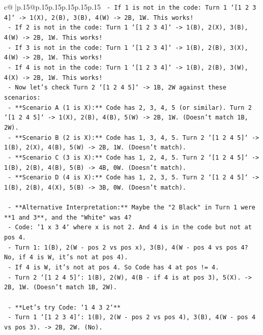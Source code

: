 \documentclass{article}
\begin{document}
{\begin{supertabular}{c@{$\;$}|p{.15\linewidth}@{}p{.15\linewidth}p{.15\linewidth}p{.15\linewidth}p{.15\linewidth}p{.15\linewidth}}
{{{\texttt{        {-} If 1 is not in the code: Turn 1 `{[}1 2 3 4{]}` {-}> 1(X), 2(B), 3(B), 4(W) {-}> 2B, 1W. This works!} \\
\texttt{        {-} If 2 is not in the code: Turn 1 `{[}1 2 3 4{]}` {-}> 1(B), 2(X), 3(B), 4(W) {-}> 2B, 1W. This works!} \\
\texttt{        {-} If 3 is not in the code: Turn 1 `{[}1 2 3 4{]}` {-}> 1(B), 2(B), 3(X), 4(W) {-}> 2B, 1W. This works!} \\
\texttt{        {-} If 4 is not in the code: Turn 1 `{[}1 2 3 4{]}` {-}> 1(B), 2(B), 3(W), 4(X) {-}> 2B, 1W. This works!} \\
\texttt{    {-} Now let's check Turn 2 `{[}1 2 4 5{]}` {-}> 1B, 2W against these scenarios:} \\
\texttt{        {-} **Scenario A (1 is X):** Code has 2, 3, 4, 5 (or similar). Turn 2 `{[}1 2 4 5{]}` {-}> 1(X), 2(B), 4(B), 5(W) {-}> 2B, 1W. (Doesn't match 1B, 2W).} \\
\texttt{        {-} **Scenario B (2 is X):** Code has 1, 3, 4, 5. Turn 2 `{[}1 2 4 5{]}` {-}> 1(B), 2(X), 4(B), 5(W) {-}> 2B, 1W. (Doesn't match).} \\
\texttt{        {-} **Scenario C (3 is X):** Code has 1, 2, 4, 5. Turn 2 `{[}1 2 4 5{]}` {-}> 1(B), 2(B), 4(B), 5(B) {-}> 4B, 0W. (Doesn't match).} \\
\texttt{        {-} **Scenario D (4 is X):** Code has 1, 2, 3, 5. Turn 2 `{[}1 2 4 5{]}` {-}> 1(B), 2(B), 4(X), 5(B) {-}> 3B, 0W. (Doesn't match).} \\
\\ 
\texttt{    {-} **Alternative Interpretation:** Maybe the "2 Black" in Turn 1 were **1 and 3**, and the "White" was 4?} \\
\texttt{        {-} Code: `1 x 3 4` where x is not 2. And 4 is in the code but not at pos 4.} \\
\texttt{        {-} Turn 1: 1(B), 2(W {-} pos 2 vs pos x), 3(B), 4(W {-} pos 4 vs pos 4? No, if 4 is W, it's not at pos 4).} \\
\texttt{        {-} If 4 is W, it's not at pos 4. So Code has 4 at pos != 4.} \\
\texttt{        {-} Turn 2 `{[}1 2 4 5{]}`: 1(B), 2(W), 4(B {-} if 4 is at pos 3), 5(X). {-}> 2B, 1W. (Doesn't match 1B, 2W).} \\
\\ 
\texttt{    {-} **Let's try Code: `1 4 3 2`**} \\
\texttt{        {-} Turn 1 `{[}1 2 3 4{]}`: 1(B), 2(W {-} pos 2 vs pos 4), 3(B), 4(W {-} pos 4 vs pos 3). {-}> 2B, 2W. (No).} \\
}}}
\end{supertabular}}
\end{document}
